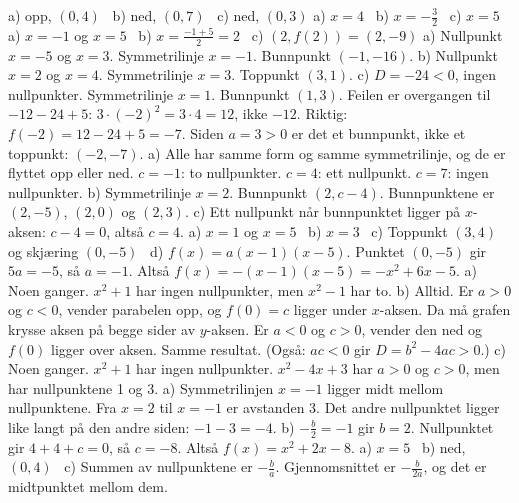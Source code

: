 
 a) opp, $(0, 4)$ \ b) ned, $(0, 7)$ \ c) ned, $(0, 3)$
 a) $x = 4$ \ b) $x = -\frac{3}{2}$ \ c) $x = 5$
 a) $x = -1$ og $x = 5$ \ b) $x = \frac{-1 + 5}{2} = 2$ \ c) $(2, f(2)) = (2, -9)$
 a) Nullpunkt $x = -5$ og $x = 3$. Symmetrilinje $x = -1$. Bunnpunkt $(-1, -16)$.
b) Nullpunkt $x = 2$ og $x = 4$. Symmetrilinje $x = 3$. Toppunkt $(3, 1)$.
c) $D = -24 < 0$, ingen nullpunkter. Symmetrilinje $x = 1$. Bunnpunkt $(1, 3)$.
 Feilen er overgangen til $-12 - 24 + 5$: $3 \cdot (-2)^2 = 3 \cdot 4 = 12$, ikke $-12$.
Riktig: $f(-2) = 12 - 24 + 5 = -7$. Siden $a = 3 > 0$ er det et bunnpunkt, ikke et toppunkt: $(-2, -7)$.
 a) Alle har samme form og samme symmetrilinje, og de er flyttet opp eller ned. $c = -1$: to nullpunkter. $c = 4$: ett nullpunkt. $c = 7$: ingen nullpunkter.
b) Symmetrilinje $x = 2$. Bunnpunkt $(2, c - 4)$. Bunnpunktene er $(2, -5)$, $(2, 0)$ og $(2, 3)$.
c) Ett nullpunkt når bunnpunktet ligger på $x$-aksen: $c - 4 = 0$, altså $c = 4$.
 a) $x = 1$ og $x = 5$ \ b) $x = 3$ \ c) Toppunkt $(3, 4)$ og skjæring $(0, -5)$ \ d) $f(x) = a(x - 1)(x - 5)$. Punktet $(0, -5)$ gir $5a = -5$, så $a = -1$. Altså $f(x) = -(x - 1)(x - 5) = -x^2 + 6x - 5$.
 a) Noen ganger. $x^2 + 1$ har ingen nullpunkter, men $x^2 - 1$ har to.
b) Alltid. Er $a > 0$ og $c < 0$, vender parabelen opp, og $f(0) = c$ ligger under $x$-aksen. Da må grafen krysse aksen på begge sider av $y$-aksen. Er $a < 0$ og $c > 0$, vender den ned og $f(0)$ ligger over aksen. Samme resultat. (Også: $ac < 0$ gir $D = b^2 - 4ac > 0$.)
c) Noen ganger. $x^2 + 1$ har ingen nullpunkter. $x^2 - 4x + 3$ har $a > 0$ og $c > 0$, men har nullpunktene 1 og 3.
 a) Symmetrilinjen $x = -1$ ligger midt mellom nullpunktene. Fra $x = 2$ til $x = -1$ er avstanden 3. Det andre nullpunktet ligger like langt på den andre siden: $-1 - 3 = -4$.
b) $-\frac{b}{2} = -1$ gir $b = 2$. Nullpunktet gir $4 + 4 + c = 0$, så $c = -8$. Altså $f(x) = x^2 + 2x - 8$.
 a) $x = 5$ \ b) ned, $(0, 4)$ \ c) Summen av nullpunktene er $-\frac{b}{a}$. Gjennomsnittet er $-\frac{b}{2a}$, og det er midtpunktet mellom dem.

